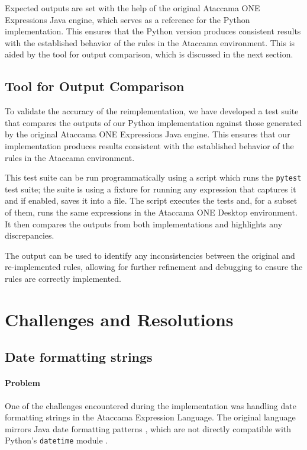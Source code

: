 Expected outputs are set with the help of the original Ataccama ONE Expressions Java engine, which serves as a reference for the Python implementation. This ensures that the Python version produces consistent results with the established behavior of the rules in the Ataccama environment. This is aided by the tool for output comparison, which is discussed in the next section.

\subsection{Tool for Output Comparison}

To validate the accuracy of the reimplementation, we have developed a test suite that compares the outputs of our Python implementation against those generated by the original Ataccama ONE Expressions Java engine. This ensures that our implementation produces results consistent with the established behavior of the rules in the Ataccama environment.

This test suite can be run programmatically using a script which runs the \texttt{pytest} test suite; the suite is using a fixture for running any expression that captures it and if enabled, saves it into a file. The script executes the tests and, for a subset of them, runs the same expressions in the Ataccama ONE Desktop environment. It then compares the outputs from both implementations and highlights any discrepancies.

The output can be used to identify any inconsistencies between the original and re-implemented rules, allowing for further refinement and debugging to ensure the rules are correctly implemented.

\section{Challenges and Resolutions}

\subsection{Date formatting strings}
\paragraph{Problem}

One of the challenges encountered during the implementation was handling date formatting strings in the Ataccama Expression Language. The original language mirrors Java date formatting patterns \cite{datetimeformatter}, which are not directly compatible with Python’s \texttt{datetime} module \cite{datetime}.

